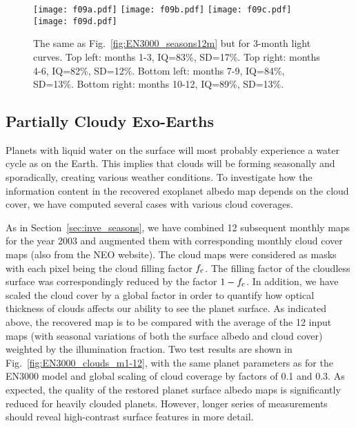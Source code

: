 \documentclass{emulateapj}
\begin{document}
\begin{figure*}
\centering
\texttt{[image: f09a.pdf]}
\texttt{[image: f09b.pdf]}
\texttt{[image: f09c.pdf]}
\texttt{[image: f09d.pdf]}
\caption{The same as Fig.~\ref{fig:EN3000_seasons12m} but for 3-month light curves. 
Top left: months 1-3, IQ=83\%, SD=17\%.
Top right: months 4-6, IQ=82\%, SD=12\%.
Bottom left: months 7-9, IQ=84\%, SD=13\%.
Bottom right: months 10-12, IQ=89\%, SD=13\%.
}
\label{fig:EN3000_seasons_m1-3}
\end{figure*}


\subsection{Partially Cloudy Exo-Earths}\label{sec:inve_clouds}

Planets with liquid water on the surface will most probably experience a water cycle
as on the Earth. This implies that clouds will be forming seasonally and sporadically,
creating various weather conditions. To investigate how the information content in the
recovered exoplanet albedo map depends on the cloud cover, we have computed several
cases with various cloud coverages.

As in Section~\ref{sec:inve_seasons}, we have combined 12 subsequent monthly maps for the year 2003
and augmented them with corresponding monthly cloud cover maps (also from the NEO website). 
The cloud maps were considered as masks with each pixel being the cloud filling factor $f_{\rm c}$.
The filling factor of the cloudless surface was correspondingly reduced by the factor $1-f_{\rm c}$.
In addition, we have scaled the cloud cover by a global factor in order to quantify how optical 
thickness of clouds affects our ability to see the planet surface. 
As indicated above, the recovered map is to be compared with the average of the 12 input maps
(with seasonal variations of both the surface albedo and cloud cover) weighted by 
the illumination fraction. Two test results are shown in
Fig.~\ref{fig:EN3000_clouds_m1-12}, with the same planet parameters as for the EN3000 model
and global scaling of cloud coverage by factors of 0.1 and 0.3. 
As expected, the quality of the restored planet surface albedo maps is significantly reduced 
for heavily clouded planets. However, longer series of measurements should reveal high-contrast
surface features in more detail.
\end{document}
